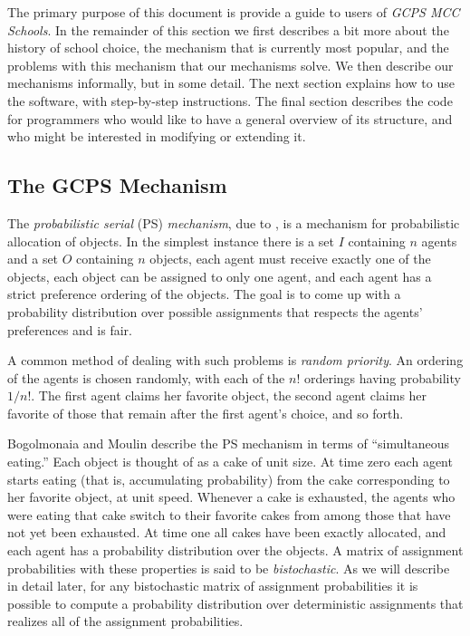 \documentclass[12pt]{article}
\theoremstyle{definition}
\begin{document}
The primary purpose of this document is provide a guide to users of
\emph{GCPS MCC Schools}.  In the remainder of this section we first
describes a bit more about the history of school choice, the mechanism
that is currently most popular, and the problems with this mechanism
that our mechanisms solve.  We then describe our mechanisms
informally, but in some detail.  The next section explains how to use
the software, with step-by-step instructions.  The final section
describes the code for programmers who would like to have a general
overview of its structure, and who might be interested in modifying or
extending it.

\subsection{The GCPS Mechanism}

The \emph{probabilistic serial} (PS) \emph{mechanism}, due to
\cite{bm01}, is a mechanism for probabilistic allocation of objects.
In the simplest instance there is a set $I$ containing $n$ agents and
a set $O$ containing $n$ objects, each agent must receive exactly one
of the objects, each object can be assigned to only one agent, and
each agent has a strict preference ordering of the objects.  The goal
is to come up with a probability distribution over possible
assignments that respects the agents' preferences and is fair.

A common method of dealing with such problems is \emph{random
priority}.  An ordering of the agents is chosen randomly, with each of
the $n!$ orderings having probability $1/n!$.  The first agent claims
her favorite object, the second agent claims her favorite of those
that remain after the first agent's choice, and so forth.

Bogolmonaia and Moulin describe the PS mechanism in terms of
``simultaneous eating.'' Each object is thought of as a cake of unit
size.  At time zero each agent starts eating (that is, accumulating
probability) from the cake corresponding to her favorite object, at
unit speed.  Whenever a cake is exhausted, the agents who were eating
that cake switch to their favorite cakes from among those that have
not yet been exhausted.  At time one all cakes have been exactly
allocated, and each agent has a probability distribution over the
objects. A matrix of assignment probabilities with these properties is
said to be \emph{bistochastic}. As we will describe in detail later,
for any bistochastic matrix of assignment probabilities it is possible
to compute a probability distribution over deterministic assignments
that realizes all of the assignment probabilities.
\end{document}
